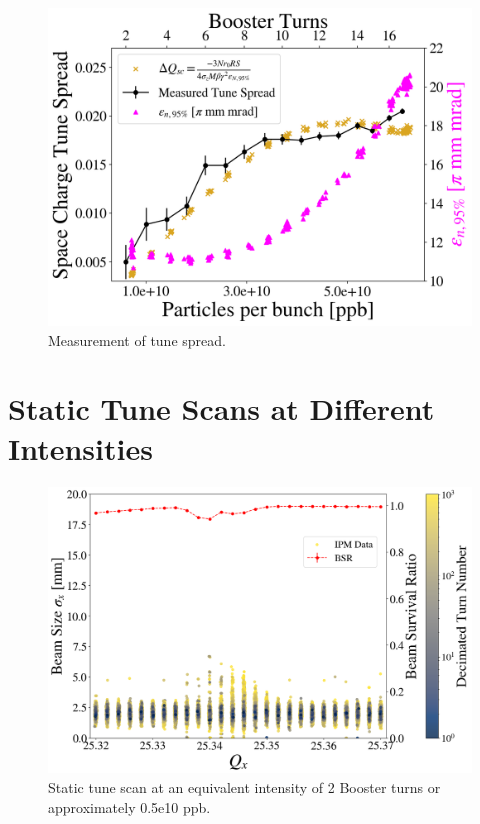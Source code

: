 
\begin{figure}[H]
    \centering
    \includegraphics[width=\columnwidth]{chapter6/tune_spread.png}
    \caption{Measurement of tune spread.}
    \label{fig:tunespread}
\end{figure}

\section{\label{sec:ch6sts}Static Tune Scans at Different Intensities}

\begin{figure}[H]
    \centering
    \includegraphics[width=\columnwidth]{chapter6/static2turns_dampersOFF.png}
    \caption{Static tune scan at an equivalent intensity of 2 Booster turns or approximately 0.5e10 ppb.}
    \label{fig:static2_scatter}
\end{figure}

